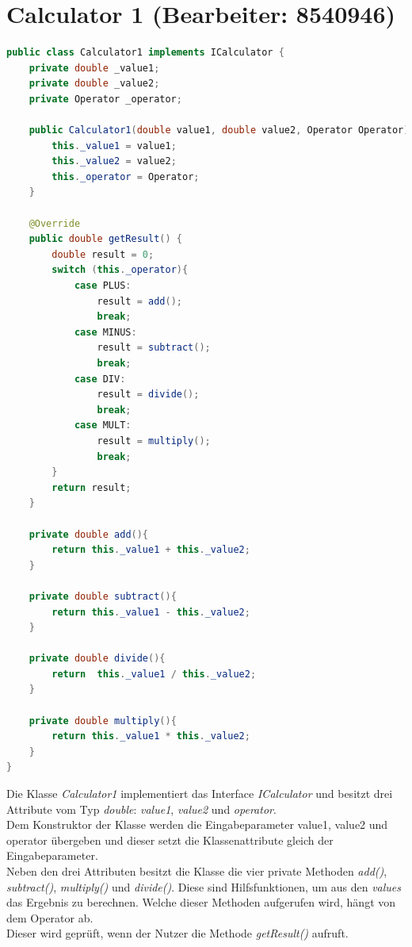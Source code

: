 \chapter{Calculator 1 (Bearbeiter: 8540946)}
\begin{lstlisting}[language=Java,basicstyle=\scriptsize, caption= Calculator 1]
public class Calculator1 implements ICalculator {
    private double _value1;
    private double _value2;
    private Operator _operator;

    public Calculator1(double value1, double value2, Operator Operator){
        this._value1 = value1;
        this._value2 = value2;
        this._operator = Operator;
    }

    @Override
    public double getResult() {
        double result = 0;
        switch (this._operator){
            case PLUS:
                result = add();
                break;
            case MINUS:
                result = subtract();
                break;
            case DIV:
                result = divide();
                break;
            case MULT:
                result = multiply();
                break;
        }
        return result;
    }

    private double add(){
        return this._value1 + this._value2;
    }

    private double subtract(){
        return this._value1 - this._value2;
    }

    private double divide(){
        return  this._value1 / this._value2;
    }

    private double multiply(){
        return this._value1 * this._value2;
    }
}
\end{lstlisting}
Die Klasse \textit{Calculator1} implementiert das Interface \textit{ICalculator} und besitzt drei Attribute vom Typ \textit{double}: \textit{\textunderscore value1}, \textit{\textunderscore value2} und \textit{\textunderscore operator}.\\
Dem Konstruktor der Klasse werden die Eingabeparameter value1, value2 und operator übergeben und dieser setzt die Klassenattribute gleich der Eingabeparameter.\\
Neben den drei Attributen besitzt die Klasse die vier private Methoden \textit{add()}, \textit{subtract()}, \textit{multiply()} und \textit{divide()}.
Diese sind Hilfsfunktionen, um aus den \textit{values} das Ergebnis zu berechnen.
Welche dieser Methoden aufgerufen wird, hängt von dem Operator ab.\\
Dieser wird geprüft, wenn der Nutzer die Methode \textit{getResult()} aufruft.
